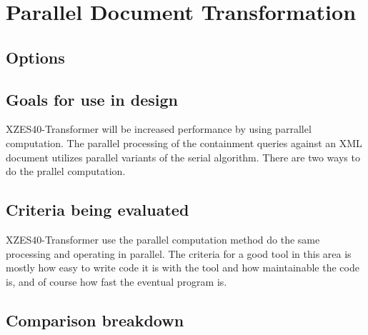 \section{Parallel Document Transformation}

\subsection{Options}

\subsection{Goals for use in design}

XZES40-Transformer will be increased performance by using parrallel computation.
The parallel processing of the containment queries against an XML document utilizes parallel variants of the serial algorithm.
There are two ways to do the prallel computation.

\subsection{Criteria being evaluated}

XZES40-Transformer use the parallel computation method do the same processing and operating in parallel.
The criteria for a good tool in this area is mostly how easy to write code it is with the tool and how maintainable the code is, and of course how fast the eventual program is.

\subsection{Comparison breakdown}

